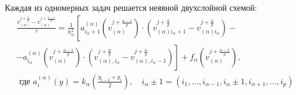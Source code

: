 Каждая из одномерных задач решается неявной двухслойной схемой:
\begin{multline*}
    \frac{v_{(\alpha)}^{j + \frac{\alpha}{p}} - v_{(\alpha)}^{j + \frac{\alpha - 1}{p}}}{\tau} =
    \frac{1}{h_{\alpha}^2} \left[ 
        a_{i_{\alpha} + 1}^{(\alpha)} \left( v_{(\alpha)}^{j + \frac{\alpha - 1}{p}} \right) \cdot \left( 
            v_{(\alpha)i_{\alpha} + 1}^{j + \frac{\alpha}{p}} - v_{(\alpha)i_{\alpha}}^{j + \frac{\alpha}{p}}
         \right)-\right.\\
         \left. - a_{i_{\alpha}}^{(\alpha)} \left(v_{(\alpha)}^{j + \frac{\alpha - 1}{p}}\right) \cdot \left( 
             v_{(\alpha), i_{\alpha}}^{j + \frac{\alpha}{p}} - v_{(\alpha), i_{\alpha} - 1}^{j + \frac{\alpha}{p}}
          \right)
     \right] + f_{\alpha} \left( 
         v_{(\alpha)}^{j + \frac{\alpha - 1}{p}}
      \right), \\
      \text{ где } a_i^{(\alpha)} (y) = k_{\alpha} \left( \frac{y_{i - 1} + y_i}{2} \right), \quad 
      i_{\alpha} \pm 1 = (i_1, \ldots, i_{\alpha - 1}, i_{\alpha} \pm 1, i_{\alpha + 1}, \ldots, i_{p})
\end{multline*}

